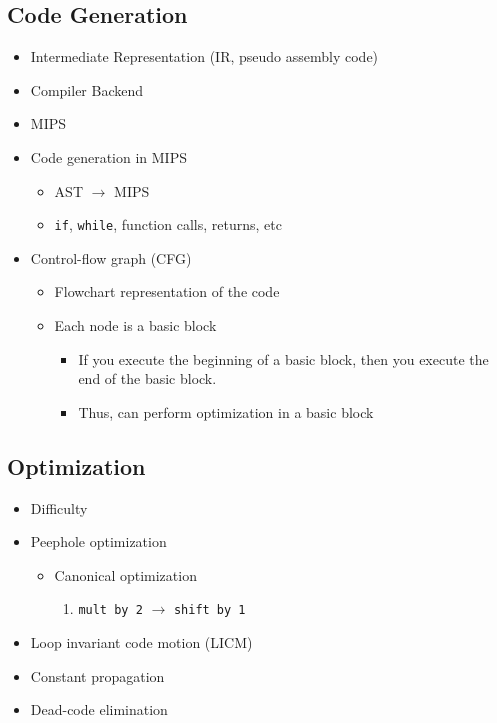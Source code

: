 \documentclass[11pt]{article}
\begin{document}
\subsection{Code Generation}
\label{sec:org570514c}
\begin{itemize}
\item Intermediate Representation (IR, pseudo assembly code)
\item Compiler Backend
\item MIPS
\item Code generation in MIPS
\begin{itemize}
\item AST \(\rightarrow\) MIPS
\item \texttt{if}, \texttt{while}, function calls, returns, etc
\end{itemize}
\item Control-flow graph (CFG)
\begin{itemize}
\item Flowchart representation of the code
\item Each node is a basic block
\begin{itemize}
\item If you execute the beginning of a basic block, then you execute the end of the basic block.
\item Thus, can perform optimization in a basic block
\end{itemize}
\end{itemize}
\end{itemize}
\subsection{Optimization}
\label{sec:orgc5f8446}
\begin{itemize}
\item Difficulty
\item Peephole optimization
\begin{itemize}
\item Canonical optimization
\begin{enumerate}
\item \texttt{mult by 2} \(\rightarrow\) \texttt{shift by 1}
\end{enumerate}
\end{itemize}
\item Loop invariant code motion (LICM)
\item Constant propagation
\item Dead-code elimination
\end{itemize}
\end{document}

